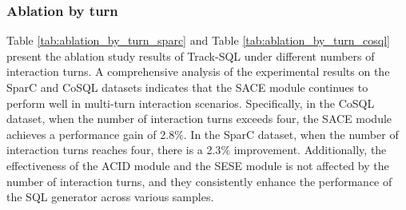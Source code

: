 \documentclass[11pt]{article}
\begin{document}
\begin{table}[]
    \centering
    \renewcommand\arraystretch{1.4}
    \caption{Ablation results of Track-SQL on CoSQL validation set by difficulty. The numbers in brackets () indicate the number of samples.}
    \label{tab:ablation_by_difficulty_cosql}
\end{table}



\subsubsection{Ablation by turn}
\label{sec:ablation_by_turn}
Table \ref{tab:ablation_by_turn_sparc} and Table \ref{tab:ablation_by_turn_cosql} present the ablation study results of Track-SQL under different numbers of interaction turns. A comprehensive analysis of the experimental results on the SparC and CoSQL datasets indicates that the SACE module continues to perform well in multi-turn interaction scenarios. Specifically, in the CoSQL dataset, when the number of interaction turns exceeds four, the SACE module achieves a performance gain of 2.8$\%$. In the SparC dataset, when the number of interaction turns reaches four, there is a 2.3$\%$ improvement. Additionally, the effectiveness of the ACID module and the SESE module is not affected by the number of interaction turns, and they consistently enhance the performance of the SQL generator across various samples.
\end{document}
